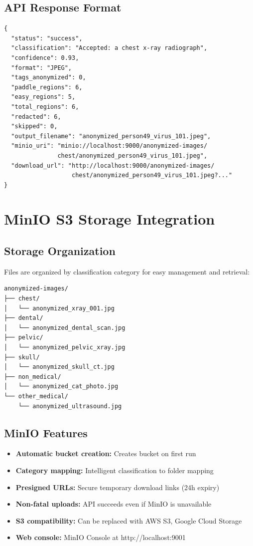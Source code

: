 \documentclass[12pt,a4paper]{article}
\begin{document}
\subsection{API Response Format}

\begin{verbatim}
{
  "status": "success",
  "classification": "Accepted: a chest x-ray radiograph",
  "confidence": 0.93,
  "format": "JPEG",
  "tags_anonymized": 0,
  "paddle_regions": 6,
  "easy_regions": 5,
  "total_regions": 6,
  "redacted": 6,
  "skipped": 0,
  "output_filename": "anonymized_person49_virus_101.jpeg",
  "minio_uri": "minio://localhost:9000/anonymized-images/
               chest/anonymized_person49_virus_101.jpeg",
  "download_url": "http://localhost:9000/anonymized-images/
                   chest/anonymized_person49_virus_101.jpeg?..."
}
\end{verbatim}

\section{MinIO S3 Storage Integration}

\subsection{Storage Organization}

Files are organized by classification category for easy management and retrieval:

\begin{verbatim}
anonymized-images/
├── chest/
│   └── anonymized_xray_001.jpg
├── dental/
│   └── anonymized_dental_scan.jpg
├── pelvic/
│   └── anonymized_pelvic_xray.jpg
├── skull/
│   └── anonymized_skull_ct.jpg
├── non_medical/
│   └── anonymized_cat_photo.jpg
└── other_medical/
    └── anonymized_ultrasound.jpg
\end{verbatim}

\subsection{MinIO Features}

\begin{itemize}[leftmargin=1.2cm]
    \item \textbf{Automatic bucket creation:} Creates bucket on first run
    \item \textbf{Category mapping:} Intelligent classification to folder mapping
    \item \textbf{Presigned URLs:} Secure temporary download links (24h expiry)
    \item \textbf{Non-fatal uploads:} API succeeds even if MinIO is unavailable
    \item \textbf{S3 compatibility:} Can be replaced with AWS S3, Google Cloud Storage
    \item \textbf{Web console:} MinIO Console at http://localhost:9001
\end{itemize}
\end{document}
